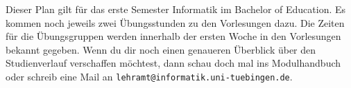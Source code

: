 Dieser Plan gilt für das erste Semester Informatik im Bachelor of Education. Es kommen noch jeweils zwei Übungsstunden zu den Vorlesungen dazu.
Die Zeiten für die Übungsgruppen werden innerhalb der ersten Woche in den Vorlesungen bekannt gegeben. Wenn du dir noch einen genaueren Überblick über den Studienverlauf verschaffen möchtest, dann schau doch mal ins Modulhandbuch oder schreib eine Mail an \texttt{lehramt@informatik.uni-tuebingen.de}.

